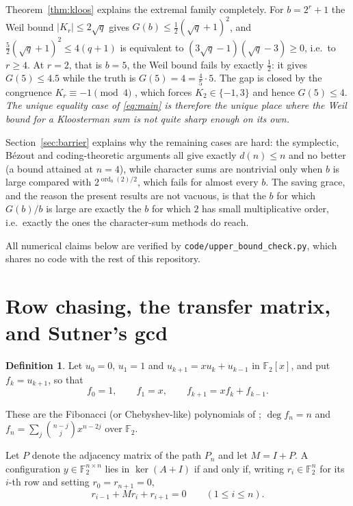 \documentclass[a4paper]{article}
\theoremstyle{definition}
\newtheorem{definition}[theorem]{Definition}
\newcommand{\F}{\mathbb{F}}
\newcommand{\abs}[1]{\left| #1 \right|}
\begin{document}
	Theorem~\ref{thm:kloos} explains the extremal family completely.
	For $b = 2^r + 1$ the Weil bound $\abs{K_r} \leq 2\sqrt{q}$ gives $G(b) \le \frac{1}{2}(\sqrt q + 1)^2$, and $\frac{5}{2}(\sqrt{q}+1)^2 \leq 4(q+1)$ is equivalent to $(3\sqrt{q} - 1)(\sqrt{q} - 3) \geq 0$, i.e.\ to $r \geq 4$.
	At $r = 2$, that is $b = 5$, the Weil bound fails by exactly $\tfrac12$: it gives $G(5) \leq 4.5$ while the truth is $G(5) = 4 = \frac{4}{5} \cdot 5$.
	The gap is closed by the congruence $K_r \equiv -1 \pmod 4$ \cite{LachaudWolfmann1990}, which forces $K_2 \in \{-1, 3\}$ and hence $G(5) \leq 4$.
	\emph{The unique equality case of \eqref{eq:main} is therefore the unique place where the Weil bound for a Kloosterman sum is not quite sharp enough on its own.}

	Section~\ref{sec:barrier} explains why the remaining cases are hard: the symplectic, Bézout and coding-theoretic arguments all give exactly $d(n) \leq n$ and no better (a bound attained at $n = 4$), while character sums are nontrivial only when $b$ is large compared with $2^{\operatorname{ord}_b(2)/2}$, which fails for almost every $b$.
	The saving grace, and the reason the present results are not vacuous, is that the $b$ for which $G(b)/b$ is large are exactly the $b$ for which $2$ has small multiplicative order, i.e.\ exactly the ones the character-sum methods do reach.

	All numerical claims below are verified by \texttt{code/upper\_bound\_check.py}, which shares no code with the rest of this repository.

	\section{Row chasing, the transfer matrix, and Sutner's gcd}\label{sec:rowchase}
	\begin{definition}
		Let $u_0 = 0$, $u_1 = 1$ and $u_{k+1} = x u_k + u_{k-1}$ in $\F_2[x]$, and put $f_k = u_{k+1}$, so that
		\begin{equation*}
			f_0 = 1, \qquad f_1 = x, \qquad f_{k+1} = x f_k + f_{k-1}.
		\end{equation*}
	\end{definition}
	These are the Fibonacci (or Chebyshev-like) polynomials of \cite{Sutner96sigma-automataand, HUNZIKER2004465, GoldwasserKlostermeyerWare2002}; $\deg f_n = n$ and $f_n = \sum_{j} \binom{n-j}{j} x^{n-2j}$ over $\F_2$.

	Let $P$ denote the adjacency matrix of the path $P_n$ and let $M = I + P$.
	A configuration $y \in \F_2^{n \times n}$ lies in $\ker(A+I)$ if and only if, writing $r_i \in \F_2^n$ for its $i$-th row and setting $r_0 = r_{n+1} = 0$,
	\begin{equation}\label{eq:rowchase}
		r_{i-1} + M r_i + r_{i+1} = 0 \qquad (1 \leq i \leq n).
	\end{equation}
\end{document}
